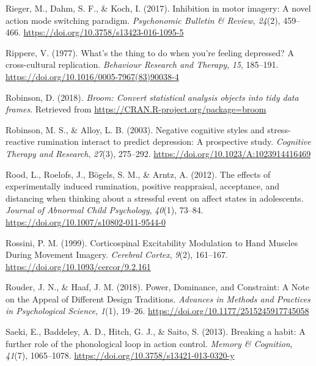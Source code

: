 \documentclass[a4paper,12pt,twoside,onecolumn,openright,final,oldfontcommands]{memoir}
\begin{document}
\leavevmode\hypertarget{ref-rieger_inhibition_2017}{}%
Rieger, M., Dahm, S. F., \& Koch, I. (2017). Inhibition in motor imagery: A novel action mode switching paradigm. \emph{Psychonomic Bulletin \& Review}, \emph{24}(2), 459--466. \url{https://doi.org/10.3758/s13423-016-1095-5}

\leavevmode\hypertarget{ref-Rippere1977}{}%
Rippere, V. (1977). What's the thing to do when you're feeling depressed? A cross-cultural replication. \emph{Behaviour Research and Therapy}, \emph{15}, 185--191. \url{https://doi.org/10.1016/0005-7967(83)90038-4}

\leavevmode\hypertarget{ref-R-broom}{}%
Robinson, D. (2018). \emph{Broom: Convert statistical analysis objects into tidy data frames}. Retrieved from \url{https://CRAN.R-project.org/package=broom}

\leavevmode\hypertarget{ref-Robinson2003}{}%
Robinson, M. S., \& Alloy, L. B. (2003). Negative cognitive styles and stress-reactive rumination interact to predict depression: A prospective study. \emph{Cognitive Therapy and Research}, \emph{27}(3), 275--292. \url{https://doi.org/10.1023/A:1023914416469}

\leavevmode\hypertarget{ref-Rood2012}{}%
Rood, L., Roelofs, J., Bögels, S. M., \& Arntz, A. (2012). The effects of experimentally induced rumination, positive reappraisal, acceptance, and distancing when thinking about a stressful event on affect states in adolescents. \emph{Journal of Abnormal Child Psychology}, \emph{40}(1), 73--84. \url{https://doi.org/10.1007/s10802-011-9544-0}

\leavevmode\hypertarget{ref-rossini_corticospinal_1999}{}%
Rossini, P. M. (1999). Corticospinal Excitability Modulation to Hand Muscles During Movement Imagery. \emph{Cerebral Cortex}, \emph{9}(2), 161--167. \url{https://doi.org/10.1093/cercor/9.2.161}

\leavevmode\hypertarget{ref-rouder_power_2018}{}%
Rouder, J. N., \& Haaf, J. M. (2018). Power, Dominance, and Constraint: A Note on the Appeal of Different Design Traditions. \emph{Advances in Methods and Practices in Psychological Science}, \emph{1}(1), 19--26. \url{https://doi.org/10.1177/2515245917745058}

\leavevmode\hypertarget{ref-saeki_breaking_2013}{}%
Saeki, E., Baddeley, A. D., Hitch, G. J., \& Saito, S. (2013). Breaking a habit: A further role of the phonological loop in action control. \emph{Memory \& Cognition}, \emph{41}(7), 1065--1078. \url{https://doi.org/10.3758/s13421-013-0320-y}
\end{document}
